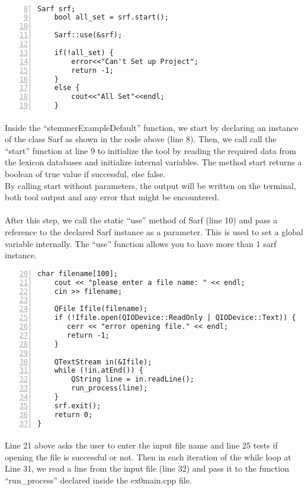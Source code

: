 \documentclass{article}
\begin{document}
\paragraph{}
\begin{Verbatim}[numbers=left,firstnumber=8]
    Sarf srf;
    bool all_set = srf.start();

    Sarf::use(&srf);

    if(!all_set) {
        error<<"Can't Set up Project";
        return -1;
    }
    else {
        cout<<"All Set"<<endl;
    }
\end{Verbatim}

\paragraph{}
Inside the ``stemmerExampleDefault'' function, we start by declaring an instance of the class Sarf as shown in the code above (line 8). Then, we call call the ``start'' function at line 9 to initialize the tool by reading the required data from the lexicon databases and initialize internal variables. The method start returns a boolean of true value if successful, else false.\\

By calling start without parameters, the output will be written on the terminal, both tool output and any error that might be encountered.

\paragraph{}
After this step, we call the static ``use'' method of Sarf (line 10) and pass a reference to the declared Sarf instance as a parameter. This is used to set a global variable internally. The ``use'' function allows you to have more than 1 sarf instance.

\begin{Verbatim}[numbers=left,firstnumber=20]
    char filename[100];
    cout << "please enter a file name: " << endl;
    cin >> filename;

    QFile Ifile(filename);
    if (!Ifile.open(QIODevice::ReadOnly | QIODevice::Text)) {
       cerr << "error opening file." << endl;
       return -1;
    }

    QTextStream in(&Ifile);
    while (!in.atEnd()) {
        QString line = in.readLine();
        run_process(line);
    }
    srf.exit();
    return 0;
}
\end{Verbatim}

\paragraph{}
Line 21 above asks the user to enter the input file name and line 25 tests if opening the file is successful or not. Then in each iteration of the while loop at Line 31, we read a line from the 
input file (line 32) and pass it to the function ``run\_process'' declared inside the ex0main.cpp file.
\end{document}
